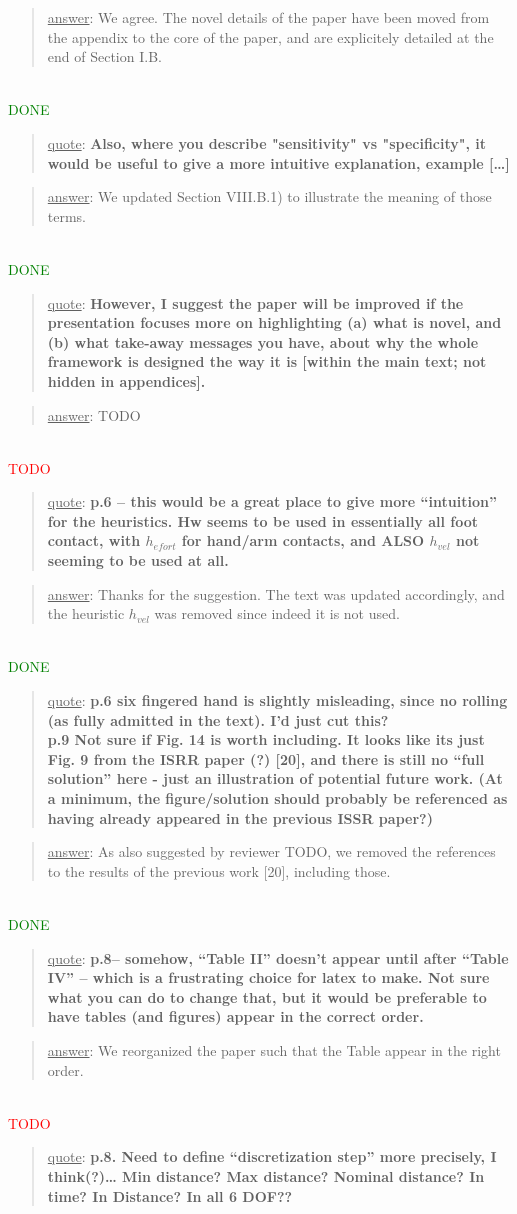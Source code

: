 \documentclass[a4paper]{article}
\newcommand{\done}[0]{\textcolor{green}{DONE}}
\newcommand{\ndone}[0]{\textcolor{red}{TODO}}
\newcommand\quot[1]{\begin{quote} \underline{quote}: \textbf{#1}\end{quote}}
\newcommand\as[1]{\begin{quote} \underline{answer}: {#1}\end{quote} \leavevmode \\ }
\begin{document}
\as{We agree. The novel details of the paper have been moved from the appendix to the core of the paper, and are explicitely detailed at the end of Section I.B.} \done

\quot{
Also, where you describe "sensitivity" vs "specificity", it would be
useful to give a more intuitive explanation, example [\dots]}

\as{We updated Section VIII.B.1) to illustrate the meaning of those terms.} \done

\quot{
However, I suggest the paper will be improved if
the presentation focuses more on highlighting (a) what is novel, and
(b)
what take-away messages you have, about why the whole framework is
designed the way it is [within the main text; not hidden in
appendices].}

\as{TODO}\ndone

\quot{
p.6 – this would be a great place to give more ``intuition'' for the heuristics. Hw seems to be used in essentially all foot contact, with $h_{efort}$ for hand/arm contacts, and ALSO $h_{vel}$ not seeming to be used at all.}
\as{Thanks for the suggestion. The text was updated accordingly, and the heuristic $h_{vel}$ was removed since indeed it is not used.} \done


\quot{
p.6 six fingered hand is slightly misleading, since no rolling (as fully admitted in the text). I'd just cut this? \\
p.9 Not sure if Fig. 14 is worth including. It looks like its just Fig. 9 from the ISRR paper (?) [20], and there is still no ``full solution'' here -
 just an illustration of potential future work. 
 (At a minimum, the figure/solution should probably be referenced as having already appeared in the previous ISSR paper?)
}

\as{As also suggested by reviewer TODO, we removed the references to the results of the previous work [20], including those.}\done

\quot{
p.8– somehow, “Table II” doesn’t appear until after “Table IV” – which is a frustrating choice for latex to make. Not sure what you can do to change that, but it would be preferable to have tables (and figures) appear in the correct order.
}

\as{We reorganized the paper such that the Table appear in the right order.}\ndone

\quot{
p.8. Need to define ``discretization step'' more precisely, I think(?)… Min distance? Max distance? Nominal distance? In time? In Distance? In all 6 DOF??
}
\end{document}
